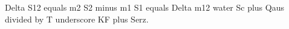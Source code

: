 Delta S12 equals m2 S2 minus m1 S1 equals Delta m12 water Sc plus Qaus divided by T underscore KF plus Serz.